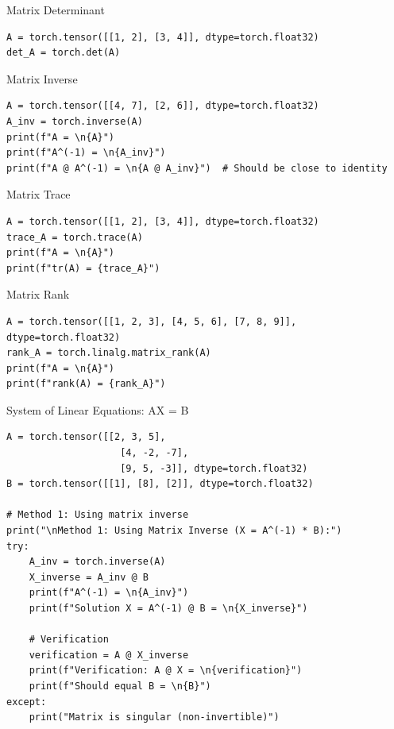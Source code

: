 \documentclass[aspectratio=169,xcolor=dvipsnames,svgnames,x11names,fleqn]{beamer}
\begin{document}
\begin{frame}[containsverbatim]{Matrix Determinant}
\begin{verbatim}
A = torch.tensor([[1, 2], [3, 4]], dtype=torch.float32)
det_A = torch.det(A)
\end{verbatim}
\end{frame}



\begin{frame}[containsverbatim]{Matrix Inverse}
\begin{verbatim}
A = torch.tensor([[4, 7], [2, 6]], dtype=torch.float32)
A_inv = torch.inverse(A)
print(f"A = \n{A}")
print(f"A^(-1) = \n{A_inv}")
print(f"A @ A^(-1) = \n{A @ A_inv}")  # Should be close to identity
\end{verbatim}
\end{frame}


\begin{frame}[containsverbatim]{Matrix Trace}
\begin{verbatim}
A = torch.tensor([[1, 2], [3, 4]], dtype=torch.float32)
trace_A = torch.trace(A)
print(f"A = \n{A}")
print(f"tr(A) = {trace_A}")
\end{verbatim}
\end{frame}


\begin{frame}[containsverbatim]{Matrix Rank}
\begin{verbatim}
A = torch.tensor([[1, 2, 3], [4, 5, 6], [7, 8, 9]], dtype=torch.float32)
rank_A = torch.linalg.matrix_rank(A)
print(f"A = \n{A}")
print(f"rank(A) = {rank_A}")
\end{verbatim}
\end{frame}


\begin{frame}[containsverbatim]{System of Linear Equations: AX = B}
\begin{verbatim}
A = torch.tensor([[2, 3, 5], 
                    [4, -2, -7], 
                    [9, 5, -3]], dtype=torch.float32)
B = torch.tensor([[1], [8], [2]], dtype=torch.float32)

# Method 1: Using matrix inverse
print("\nMethod 1: Using Matrix Inverse (X = A^(-1) * B):")
try:
    A_inv = torch.inverse(A)
    X_inverse = A_inv @ B
    print(f"A^(-1) = \n{A_inv}")
    print(f"Solution X = A^(-1) @ B = \n{X_inverse}")
    
    # Verification
    verification = A @ X_inverse
    print(f"Verification: A @ X = \n{verification}")
    print(f"Should equal B = \n{B}")
except:
    print("Matrix is singular (non-invertible)")

\end{verbatim}
\end{frame}
\end{document}
